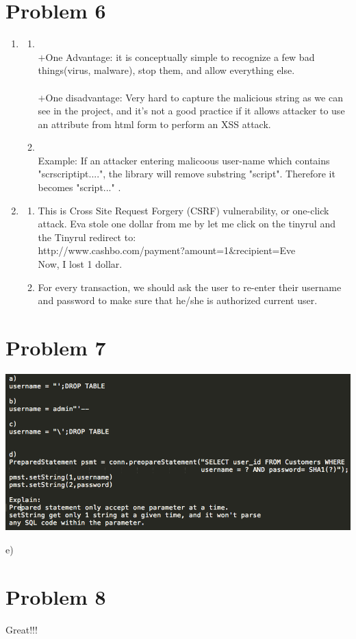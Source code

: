 \documentclass[11pt]{article}
\newenvironment{qparts}{\begin{enumerate}[{(}a{)}]}{\end{enumerate}}
\begin{document}
\newpage
\section*{Problem 6}

\begin{enumerate}

\item
\begin{qparts}
\item
{}
\\
$+$One Advantage: it is conceptually simple to recognize a few bad things(virus, malware), stop them, and allow everything else.
\\\\
$+$One disadvantage: Very hard to capture the malicious string as we can see in the project, and it's not a good practice if it allows attacker to use an attribute from html form to perform an XSS attack.
\\

\item
{}
\\
Example: If an attacker entering malicoous user-name which contains "scrscriptipt....", the library will remove substring "script". Therefore it becomes "script..." . 
\end{qparts}

\item
\begin{qparts}
\item
This is Cross Site Request Forgery (CSRF) vulnerability, or one-click attack. Eva stole one dollar from me by let me click on the tinyrul and the Tinyrul redirect to:\\
http://www.cashbo.com/payment?amount=1$\&$recipient=Eve\\
Now, I lost 1 dollar.\\
\item
For every transaction, we should ask the user to re-enter their username and password to make sure that he/she is authorized current user.
\end{qparts}

\end{enumerate} 

\newpage
\section*{Problem 7}


\includegraphics[scale=0.5]{7abcd.png}


e)
\newpage
\section*{Problem 8}
Great!!!
\end{document}

